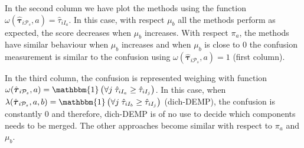 \documentclass[10pt, a4paper]{article}
\newcommand{\m}[1]{\boldsymbol{#1}}
\begin{document}
\begin{spacing}{1.9}
In the second column we have plot the methods using the function $\omega(\hat{\m \tau}_{i \mathcal{P}_s}, a) = \hat{\tau}_{iI_a}$. In this case, with respect $\mu_b$ all the methods perform as expected, the score decreases when $\mu_b$ increases. With respect $\pi_a$, the methods have similar behaviour when $\mu_b$ increases and when $\mu_b$ is close to $0$ the confusion measurement is similar to the confusion using $\omega(\hat{\m \tau}_{i \mathcal{P}_s}, a) = 1$ (first column).

In the third column, the confusion is represented weighing with function $\omega(\hat{\m \tau}_{i \mathcal{P}_s}, a) = \mathbbm{1}\left( \forall j\; \hat{\tau}_{i I_{a}} \geq \hat{\tau}_{iI_j} \right)$. In this case, when  $\lambda(\hat{\m \tau}_{i \mathcal{P}_s}, a, b) = \mathbbm{1}\left( \forall j\; \hat{\tau}_{i I_{b}} \geq \hat{\tau}_{iI_j} \right)$ (dich-DEMP), the confusion is constantly $0$ and therefore, dich-DEMP is of no use to decide which components needs to be merged. The other approaches become similar with respect to $\pi_a$ and $\mu_b$.



\end{spacing}
\end{document}
